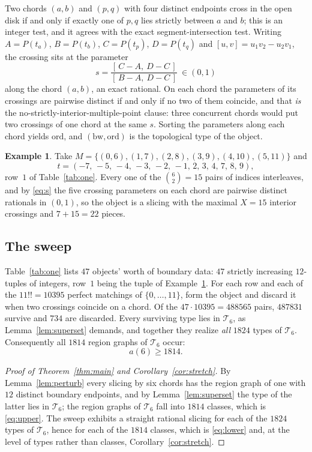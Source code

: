 \documentclass[11pt]{amsart}
\theoremstyle{definition}
\newtheorem{example}{Example}
\theoremstyle{remark}
\newcommand{\Tn}{\mathcal T}
\begin{document}
Two chords $(a,b)$ and $(p,q)$ with four distinct endpoints cross in the open disk if and
only if exactly one of $p,q$ lies strictly between $a$ and $b$; this is an integer test,
and it agrees with the exact segment-intersection test. Writing $A=P(t_a)$, $B=P(t_b)$,
$C=P(t_p)$, $D=P(t_q)$ and $[u,v]=u_1v_2-u_2v_1$, the crossing sits at the parameter
\begin{equation}\label{eq:s}
 s=\frac{[\,C-A,\ D-C\,]}{[\,B-A,\ D-C\,]}\ \in(0,1)
\end{equation}
along the chord $(a,b)$, an exact rational. On each chord the parameters of its crossings
are pairwise distinct if and only if no two of them coincide, and that \emph{is} the
no-strictly-interior-multiple-point clause: three concurrent chords would put two
crossings of one chord at the same $s$. Sorting the parameters along each chord yields
$\mathrm{ord}$, and $(\mathrm{bw},\mathrm{ord})$ is the topological type of the object.

\begin{example}\label{ex:wit}
Take $M=\{(0,6),(1,7),(2,8),(3,9),(4,10),(5,11)\}$ and
\[
 t=(-7,\,-5,\,-4,\,-3,\,-2,\,-1,\,2,\,3,\,4,\,7,\,8,\,9),
\]
row~$1$ of Table~\ref{tab:one}. Every one of the $\binom62=15$ pairs of indices
interleaves, and by \eqref{eq:s} the five crossing parameters on each chord are pairwise
distinct rationals in $(0,1)$, so the object is a slicing with the maximal $X=15$ interior
crossings and $7+15=22$ pieces.
\end{example}

\subsection*{The sweep} Table~\ref{tab:one} lists $47$ objects' worth of boundary data:
$47$ strictly increasing $12$-tuples of integers, row~$1$ being the tuple of
Example~\ref{ex:wit}. For each row and each of the $11!!=10395$ perfect matchings of
$\{0,\ldots,11\}$, form the object and discard it when two crossings coincide on a chord.
Of the $47\cdot10395=488565$ pairs, $487831$ survive and $734$ are discarded. Every
surviving type lies in $\Tn_6$, as Lemma~\ref{lem:superset} demands, and together they
realize \emph{all} $1824$ types of $\Tn_6$. Consequently all $1814$ region graphs of
$\Tn_6$ occur:
\begin{equation}\label{eq:lower}
 a(6)\ge 1814 .
\end{equation}

\begin{proof}[Proof of Theorem~\ref{thm:main} and Corollary~\ref{cor:stretch}]
By Lemma~\ref{lem:perturb} every slicing by six chords has the region graph of one with
$12$ distinct boundary endpoints, and by Lemma~\ref{lem:superset} the type of the latter
lies in $\Tn_6$; the region graphs of $\Tn_6$ fall into $1814$ classes, which is
\eqref{eq:upper}. The sweep exhibits a straight rational slicing for each of the $1824$
types of $\Tn_6$, hence for each of the $1814$ classes, which is \eqref{eq:lower} and, at
the level of types rather than classes, Corollary~\ref{cor:stretch}.
\end{proof}
\end{document}
